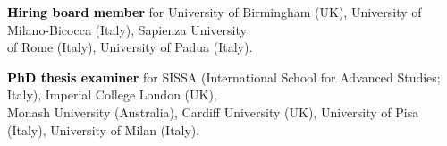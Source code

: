 

\vspace{0.2cm}
\textbf{\textcolor{black}{Hiring board member}} for University of Birmingham (UK), University of Milano-Bicocca (Italy), Sapienza University \\ \phantom{xx} of Rome (Italy), University of Padua (Italy). 

\vspace{0.2cm}
\textbf{\textcolor{black}{PhD thesis examiner}} for SISSA (International School for Advanced Studies; Italy), Imperial College London (UK),
 \\ \phantom{xx} Monash University (Australia),  Cardiff University (UK), 
 University of Pisa (Italy), University of Milan (Italy). %


